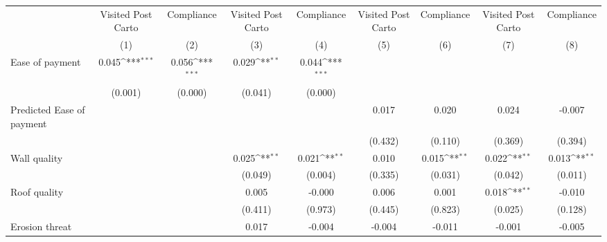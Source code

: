 {
\def\sym#1{\ifmmode^{#1}\else\(^{#1}\)\fi}
\begin{tabular}{l*{8}{c}}
\toprule
                &\multicolumn{1}{c}{Visited Post Carto}&\multicolumn{1}{c}{Compliance}&\multicolumn{1}{c}{Visited Post Carto}&\multicolumn{1}{c}{Compliance}&\multicolumn{1}{c}{Visited Post Carto}&\multicolumn{1}{c}{Compliance}&\multicolumn{1}{c}{Visited Post Carto}&\multicolumn{1}{c}{Compliance}\\
                &\multicolumn{1}{c}{(1)}         &\multicolumn{1}{c}{(2)}         &\multicolumn{1}{c}{(3)}         &\multicolumn{1}{c}{(4)}         &\multicolumn{1}{c}{(5)}         &\multicolumn{1}{c}{(6)}         &\multicolumn{1}{c}{(7)}         &\multicolumn{1}{c}{(8)}         \\
\midrule
Ease of payment &    0.045\sym{***}&    0.056\sym{***}&    0.029\sym{**} &    0.044\sym{***}&                  &                  &                  &                  \\
                &  (0.001)         &  (0.000)         &  (0.041)         &  (0.000)         &                  &                  &                  &                  \\
Predicted Ease of payment&                  &                  &                  &                  &    0.017         &    0.020         &    0.024         &   -0.007         \\
                &                  &                  &                  &                  &  (0.432)         &  (0.110)         &  (0.369)         &  (0.394)         \\
Wall quality    &                  &                  &    0.025\sym{**} &    0.021\sym{**} &    0.010         &    0.015\sym{**} &    0.022\sym{**} &    0.013\sym{**} \\
                &                  &                  &  (0.049)         &  (0.004)         &  (0.335)         &  (0.031)         &  (0.042)         &  (0.011)         \\
Roof quality    &                  &                  &    0.005         &   -0.000         &    0.006         &    0.001         &    0.018\sym{**} &   -0.010         \\
                &                  &                  &  (0.411)         &  (0.973)         &  (0.445)         &  (0.823)         &  (0.025)         &  (0.128)         \\
Erosion threat  &                  &                  &    0.017         &   -0.004         &   -0.004         &   -0.011         &   -0.001         &   -0.005         \\

\end{tabular}}

